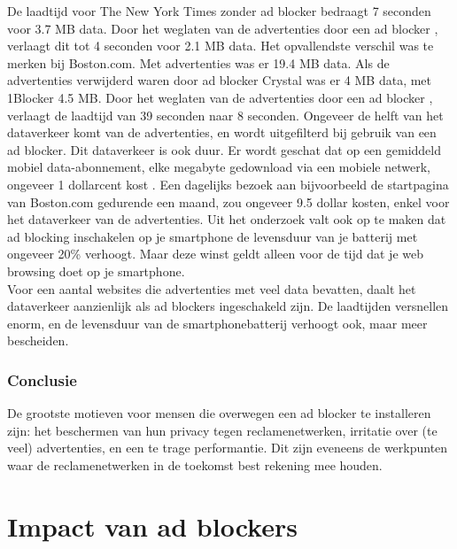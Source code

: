 \documentclass[pdftex,a4paper,12pt,twoside]{report}
\begin{document}
De laadtijd voor The New York Times zonder ad blocker bedraagt 7 seconden voor 3.7 MB data. Door het weglaten van de advertenties door een ad blocker , verlaagt dit tot 4 seconden voor 2.1 MB data. Het opvallendste verschil was te merken bij Boston.com. Met advertenties was er 19.4 MB data. Als de advertenties verwijderd waren door ad blocker Crystal was er 4 MB data, met 1Blocker 4.5 MB. Door het weglaten van de advertenties door een ad blocker , verlaagt de laadtijd van 39 seconden naar 8 seconden.
Ongeveer de helft van het dataverkeer komt van de advertenties, en wordt uitgefilterd bij gebruik van een ad blocker. Dit dataverkeer is ook duur. Er wordt geschat dat op een gemiddeld mobiel data-abonnement, elke megabyte gedownload via een mobiele netwerk, ongeveer 1 dollarcent kost . Een dagelijks bezoek aan bijvoorbeeld de startpagina van Boston.com gedurende een maand, zou ongeveer 9.5 dollar kosten, enkel voor het dataverkeer van de advertenties. 
Uit het onderzoek valt ook op te maken dat ad blocking inschakelen op je smartphone de levensduur van je batterij met ongeveer 20\% verhoogt. Maar deze winst geldt alleen voor de tijd dat je web browsing doet op je smartphone.
\\
Voor een aantal websites die advertenties met veel data bevatten, daalt het dataverkeer aanzienlijk als ad blockers ingeschakeld zijn. De laadtijden versnellen enorm, en de levensduur van de smartphonebatterij verhoogt ook, maar meer bescheiden.

\subsection{Conclusie}
\label{sec Conclusie}
De grootste motieven voor mensen die overwegen een ad blocker te installeren zijn: het beschermen van hun privacy tegen reclamenetwerken, irritatie over (te veel) advertenties, en een te trage performantie. Dit zijn eveneens de werkpunten waar de reclamenetwerken in de toekomst best rekening mee houden. 

\chapter{Impact van ad blockers}
\label{ch: Impact van ad blockers}
\end{document}
